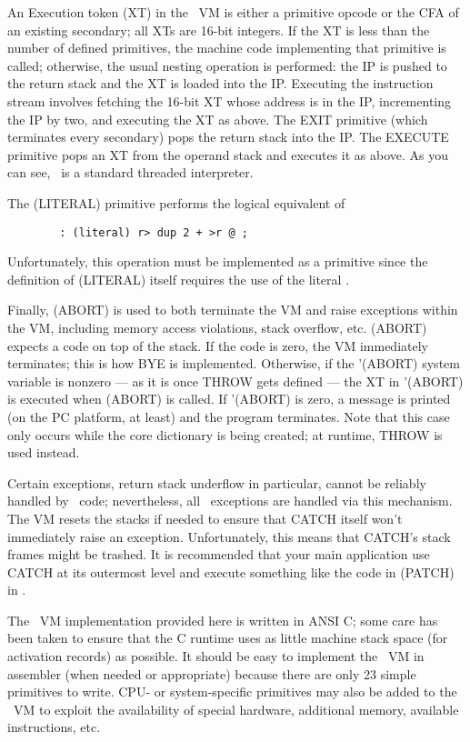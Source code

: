 \documentclass{article}
\begin{document}
An Execution token (XT) in the \M\ VM is either a primitive opcode
or the CFA of an existing secondary; all XTs are 16-bit integers. If
the XT is less than the number of defined primitives, the machine
code implementing that primitive is called; otherwise, the usual
nesting operation is performed: the IP is pushed to the return stack
and the XT is loaded into the IP. Executing the instruction stream
involves fetching the 16-bit XT whose address is in the IP,
incrementing the IP by two, and executing the XT as above. The EXIT
primitive (which terminates every secondary) pops the return stack
into the IP. The EXECUTE primitive pops an XT from the operand stack
and executes it as above. As you can see, \M\ is a standard threaded
interpreter.

The (LITERAL) primitive performs the logical equivalent of
\begin{verbatim}
        : (literal) r> dup 2 + >r @ ;
\end{verbatim}
Unfortunately, this operation must be implemented as a primitive
since the definition of (LITERAL) itself requires the use of the
literal .

Finally, (ABORT) is used to both terminate the VM and raise exceptions
within the VM, including memory access violations, stack overflow,
etc. (ABORT) expects a code on top of the stack. If the code is zero,
the VM immediately terminates; this is how BYE is
implemented. Otherwise, if the '(ABORT) system variable is nonzero ---
as it is once THROW gets defined --- the XT in '(ABORT) is executed
when (ABORT) is called. If '(ABORT) is zero, a message is printed (on
the PC platform, at least) and the program terminates. Note that this
case only occurs while the core dictionary is being created; at
runtime, THROW is used instead.

Certain exceptions, return stack underflow in particular, cannot be
reliably handled by \M\ code; nevertheless, all \M\ exceptions are
handled via this mechanism. The VM resets the stacks if needed to
ensure that CATCH itself won't immediately raise an
exception. Unfortunately, this means that CATCH's stack frames might
be trashed. It is recommended that your main application use CATCH at
its outermost level and execute something like the code in (PATCH) in
.

The \M\ VM implementation provided here is written in ANSI C; some
care has been taken to ensure that the C runtime uses as little
machine stack space (for activation records) as possible. It should be
easy to implement the \M\ VM in assembler (when needed or appropriate)
because there are only 23 simple primitives to write. CPU- or
system-specific primitives may also be added to the \M\ VM to exploit
the availability of special hardware, additional memory, available
instructions, etc.
\end{document}

